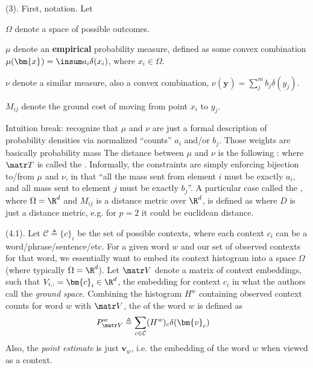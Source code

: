 \documentclass[11pt]{article}
\renewcommand\vec[2][]{\bm{#2}_{#1}}
\newcommand\myspace[1][]{\vspace{#1\bigskipamount}}
\newcommand\p{\Needspace{10\baselineskip} \noindent}
\begin{document}
\myspace
\p {} (3). First, notation. Let\textellipsis
\begin{compactitem}
	\item $\Omega$ denote a space of possible outcomes. 
	
	\item $\mu$ denote an \textbf{empirical} probability measure, defined as some convex combination $\mu(\vec x) = \insum a_i \delta(x_i)$, where $x_i \in \Omega$. 
	
	\item $\nu$ denote a similar measure, also a convex combination, $\nu(\vec y) = \sum_j^m b_j \delta(y_j)$. 
	
	\item $M_{ij}$ denote the ground cost of moving from point $x_i$ to $y_j$. 
\end{compactitem}
Intuition break: recognize that $\mu$ and $\nu$ are just a formal description of probability densities via normalized ``counts'' $a_i$ and/or $b_j$. Those weights are basically probability mass The  distance between $\mu$ and $\nu$ is the following :
where $\matr T$ is called the . Informally, the constraints are simply enforcing bijection to/from $\mu$ and $\nu$, in that ``all the mass sent from element $i$ must be exactly $a_i$, and all mass sent to element $j$ must be exactly $b_j$''. A particular case called the , where $\Omega = \R^d$ and $M_{ij}$ is a distance metric over $\R^d$, is defined as
where $D$ is just a distance metric, e.g. for $p=2$ it could be euclidean distance. 

\myspace
\p {} (4.1). Let $\mathcal C \triangleq \{ c  \}_i$ be the set of possible contexts, where each context $c_i$ can be a word/phrase/sentence/etc. For a given word $w$ and our set of observed contexts for that word, we essentially want to embed its context histogram into a space $\Omega$ (where typically $\Omega = \R^d$).  Let $\matr V$ denote a matrix of context embeddings, such that $V_{i,:} = \vec[i]{c} \in \R^d$, the embedding for context $c_i$ in what the authors call the \textit{ground space}. Combining the histogram $H^w$ containing observed context counts for word $w$ with $\matr V$, the  of the word $w$ is defined as
\begin{align}
	P_{\matr V}^w
		&\triangleq \sum_{c \in \mathcal C} (H^w)_c \delta(\vec[c]{v})
\end{align}
Also, the \textit{point estimate} is just $\vec[w]{v}$, i.e. the embedding of the word $w$ when viewed as a context. 
\end{document}
